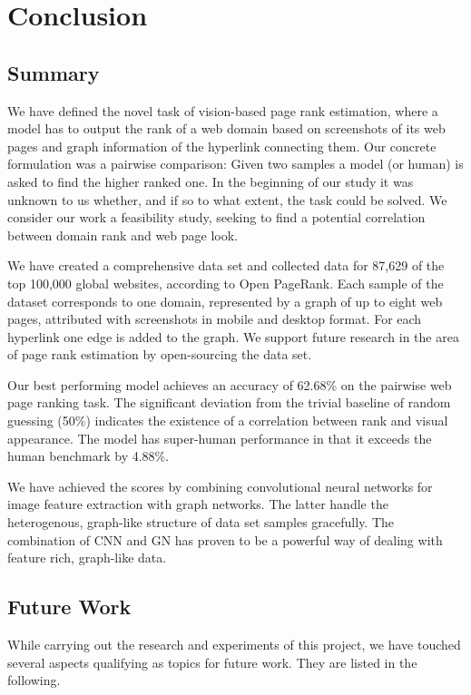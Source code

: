 \section{Conclusion}
\label{sec:conclusion}

\subsection{Summary}

We have defined the novel task of vision-based page rank estimation, where a model has to output the rank of a web domain based on screenshots of its web pages and graph information of the hyperlink connecting them. Our concrete formulation was a pairwise comparison: Given two samples a model (or human) is asked to find the higher ranked one. In the beginning of our study it was unknown to us whether, and if so to what extent, the task could be solved. We consider our work a feasibility study, seeking to find a potential correlation between domain rank and web page look.

We have created a comprehensive data set and collected data for 87,629 of the top 100,000 global websites, according to Open PageRank. Each sample of the dataset corresponds to one domain, represented by a graph of up to eight web pages, attributed with screenshots in mobile and desktop format. For each hyperlink one edge is added to the graph. We support future research in the area of page rank estimation by open-sourcing the data set.

Our best performing model achieves an accuracy of 62.68\% on the pairwise web page ranking task. The significant deviation from the trivial baseline of random guessing (50\%) indicates the existence of a correlation between rank and visual appearance. The model has super-human performance in that it exceeds the human benchmark by 4.88\%.

We have achieved the scores by combining convolutional neural networks for image feature extraction with graph networks. The latter handle the heterogenous, graph-like structure of data set samples gracefully. The combination of CNN and GN has proven to be a powerful way of dealing with feature rich, graph-like data.

\subsection{Future Work}

While carrying out the research and experiments of this project, we have touched several aspects qualifying as topics for future work. They are listed in the following.

